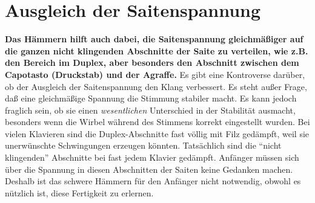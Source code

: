 \hypertarget{c2_5g}{}
\section{Ausgleich der Saitenspannung}\hypertarget{c2_5_span}{} 

\textbf{Das Hämmern hilft auch dabei, die Saitenspannung gleichmäßiger auf die ganzen nicht klingenden Abschnitte der Saite zu verteilen, wie z.B. den Bereich im Duplex, aber besonders den Abschnitt zwischen dem Capotasto (Druckstab) und der Agraffe.}
Es gibt eine Kontroverse darüber, ob der Ausgleich der Saitenspannung den Klang verbessert.
Es steht außer Frage, daß eine gleichmäßige Spannung die Stimmung stabiler macht.
Es kann jedoch fraglich sein, ob sie einen \textit{wesentlichen} Unterschied in der Stabilität ausmacht, besonders wenn die Wirbel während des Stimmens korrekt eingestellt wurden.
Bei vielen Klavieren sind die Duplex-Abschnitte fast völlig mit Filz gedämpft, weil sie unerwünschte Schwingungen erzeugen könnten.
Tatsächlich sind die \enquote{nicht klingenden} Abschnitte bei fast jedem Klavier gedämpft.
Anfänger müssen sich über die Spannung in diesen Abschnitten der Saiten keine Gedanken machen.
Deshalb ist das schwere Hämmern für den Anfänger nicht notwendig, obwohl es nützlich ist, diese Fertigkeit zu erlernen.


